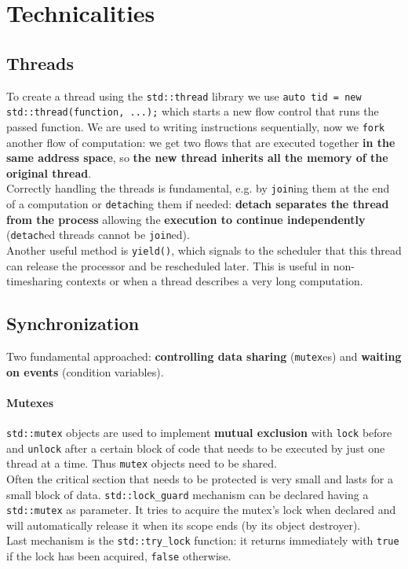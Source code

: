 \documentclass[10pt]{report}
\begin{document}
\section{Technicalities}
\subsection{Threads}
To create a thread using the \texttt{std::thread} library we use \texttt{auto tid = new std::thread(function, ...);} which starts a new flow control that runs the passed function. We are used to writing instructions sequentially, now we \texttt{fork} another flow of computation: we get two flows that are executed together \textbf{in the same address space}, so \textbf{the new thread inherits all the memory of the original thread}.\\
Correctly handling the threads is fundamental, e.g. by \texttt{join}ing them at the end of a computation or \texttt{detach}ing them if needed: \textbf{detach separates the thread from the process} allowing the \textbf{execution to continue independently} (\texttt{detach}ed threads cannot be \texttt{join}ed).\\
Another useful method is \texttt{yield()}, which signals to the scheduler that this thread can release the processor and be rescheduled later. This is useful in non-timesharing contexts or when a thread describes a very long computation.
\subsection{Synchronization}
Two fundamental approached: \textbf{controlling data sharing} (\texttt{mutex}es) and \textbf{waiting on events} (condition variables).
\paragraph{Mutexes} \texttt{std::mutex} objects are used to implement \textbf{mutual exclusion} with \texttt{lock} before and \texttt{unlock} after a certain block of code that needs to be executed by just one thread at a time. Thus \texttt{mutex} objects need to be shared.\\
Often the critical section that needs to be protected is very small and lasts for a small block of data. \texttt{std::lock\_guard} mechanism can be declared having a \texttt{std::mutex} as parameter. It tries to acquire the mutex's lock when declared and will automatically release it when its scope ends (by its object destroyer).\\
Last mechanism is the \texttt{std::try\_lock} function: it returns immediately with \texttt{true} if the lock has been acquired, \texttt{false} otherwise.
\end{document}
